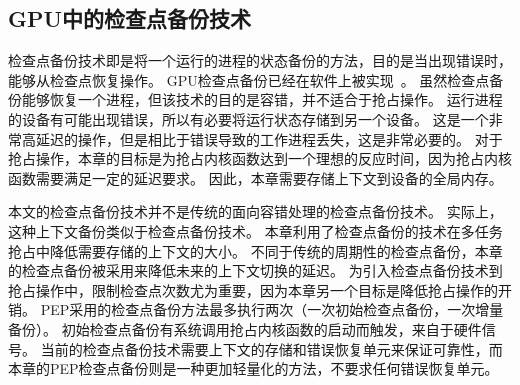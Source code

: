 \subsection{GPU中的检查点备份技术}
检查点备份技术即是将一个运行的进程的状态备份的方法，目的是当出现错误时，能够从检查点恢复操作。
GPU检查点备份已经在软件上被实现~。
虽然检查点备份能够恢复一个进程，但该技术的目的是容错，并不适合于抢占操作。
运行进程的设备有可能出现错误，所以有必要将运行状态存储到另一个设备。
这是一个非常高延迟的操作，但是相比于错误导致的工作进程丢失，这是非常必要的。
对于抢占操作，本章的目标是为抢占内核函数达到一个理想的反应时间，因为抢占内核函数需要满足一定的延迟要求。
因此，本章需要存储上下文到设备的全局内存。

本文的检查点备份技术并不是传统的面向容错处理的检查点备份技术。
实际上，这种上下文备份类似于检查点备份技术。
本章利用了检查点备份的技术在多任务抢占中降低需要存储的上下文的大小。
不同于传统的周期性的检查点备份，本章的检查点备份被采用来降低未来的上下文切换的延迟。
为引入检查点备份技术到抢占操作中，限制检查点次数尤为重要，因为本章另一个目标是降低抢占操作的开销。
PEP采用的检查点备份方法最多执行两次（一次初始检查点备份，一次增量备份）。
初始检查点备份有系统调用抢占内核函数的启动而触发，来自于硬件信号。
当前的检查点备份技术需要上下文的存储和错误恢复单元来保证可靠性，而本章的PEP检查点备份则是一种更加轻量化的方法，不要求任何错误恢复单元。




